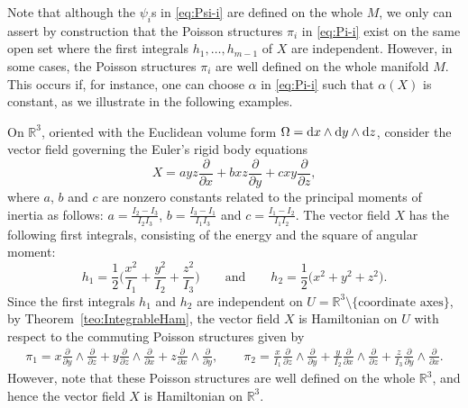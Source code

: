 \documentclass[pdftex]{sigma}%
\newcommand{\R}[1]{\mathbb{R}^{#1}}
\newcommand{\dd}{{\rm d}}
\numberwithin{equation}{section}
\begin{document}
Note that although the $\psi_{i}$s in \eqref{eq:Psi-i} are defined on the whole $M$, we only can assert by construction that the Poisson structures $\pi_i$ in \eqref{eq:Pi-i} exist on the same open set where the first integrals $h_1, \dots, h_{m-1}$ of $X$ are independent. However, in some cases, the Poisson structures $\pi_i$ are well defined on the whole manifold $M$. This occurs if, for instance, one can choose $\alpha$ in \eqref{eq:Pi-i} such that $\alpha(X)$ is constant, as we illustrate in the following examples.

\begin{Example}
On $\R{3}$, oriented with the Euclidean volume form $\Omega= \dd x \wedge \dd y \wedge \dd z$, consider the vector field governing the Euler's rigid body equations
 \begin{equation*}
 X = a yz \frac{\partial}{\partial x}+ b xz \frac{\partial}{\partial y} + c xy \frac{\partial}{\partial z},
 \end{equation*}
where $a$, $b$ and $c$ are nonzero constants related to the principal moments of inertia as follows: $a=\frac{I_2-I_3}{I_2I_3}$, $b=\frac{I_3-I_1}{I_1I_3}$ and $c=\frac{I_1-I_2}{I_1I_2}$. The vector field $X$ has the following first integrals, consisting of the energy and the square of angular moment:
 \begin{equation*}
 h_1 = \frac{1}{2}\bigg( \frac{x^2}{I_1} + \frac{y^2}{I_2} + \frac{z^2}{I_3} \bigg) \qquad \text{and} \qquad h_2 = \frac{1}{2}\big( x^2 + y^2 + z^2 \big).
 \end{equation*}
Since the first integrals $h_1$ and $h_2$ are independent on $U=\R{3} \setminus \{\text{coordinate axes}\}$, by Theo\-rem~\ref{teo:IntegrableHam}, the vector field $X$ is Hamiltonian on $U$ with respect to the commuting Poisson structures given by
 \begin{gather*}
 \pi_1 = x\frac{\partial}{\partial y}\!\wedge\! \frac{\partial}{\partial z} + y\frac{\partial}{\partial z}\!\wedge\! \frac{\partial}{\partial x}+z\frac{\partial}{\partial x}\!\wedge\! \frac{\partial}{\partial y},
 \qquad
 \pi_2 = \frac{x}{I_1}\frac{\partial}{\partial z}\!\wedge\! \frac{\partial}{\partial y} + \frac{y}{I_2}\frac{\partial}{\partial x}\!\wedge\! \frac{\partial}{\partial z}+\frac{z}{I_3}\frac{\partial}{\partial y}\!\wedge\! \frac{\partial}{\partial x}.
 \end{gather*}
However, note that these Poisson structures are well defined on the whole $\R{3}$, and hence the vector field $X$ is Hamiltonian on $\R{3}$.
\end{Example}
\end{document}
